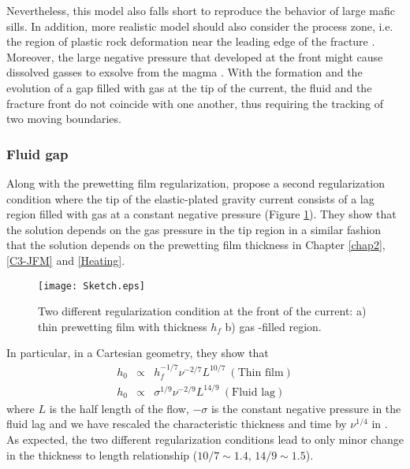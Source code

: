 Nevertheless, this model also falls short to reproduce the behavior of
large  mafic sills.   In addition,  more realistic  model should  also
consider the process zone, i.e. the region of plastic rock deformation
near the leading edge of the fracture \citep{Bunger:2008cl}. Moreover,
the large  negative pressure that  developed at the front  might cause
dissolved gasses to exsolve from the magma \citep{Lister:2013ia}. With
the formation and the evolution of a gap filled with gas at the tip of
the current, the fluid and the fracture front do not coincide with one
another, thus requiring the tracking of two moving boundaries.

\subsubsection*{Fluid gap}
\label{sec:fracturation}

Along      with      the     prewetting      film      regularization,
\citet{Anonymous:QWXp_4JV} propose  a second  regularization condition
where the tip of the elastic-plated  gravity current consists of a lag
region  filled  with  gas  at a  constant  negative  pressure  (Figure
\ref{C7-Sketch}).   They show  that the  solution depends  on the  gas
pressure in  the tip  region in  a similar  fashion that  the solution
depends  on  the prewetting  film  thickness  in Chapter  \ref{chap2},
\ref{C3-JFM} and \ref{Heating}.
\begin{figure}[h!]
 \begin{center}
 \graphicspath{ {/Users/thorey/Documents/These/Manuscript/Figure/Chapter7/} }
 \texttt{[image: Sketch.eps]}
 \caption{Two different regularization condition at the front of
 the current: a) thin prewetting film with thickness $h_f$ b) gas
 -filled region.}
 \label{C7-Sketch}
 \end{center}
\end{figure}
In particular, in a Cartesian geometry, they show that
\begin{eqnarray}
 h_0&\propto& h_f^{-1/7}\nu^{-2/7}L^{10/7}~(\text{Thin film})\\
 h_0&\propto& \sigma^{1/9}\nu^{-2/9}L^{14/9}~(\text{Fluid lag})
\end{eqnarray}
where $L$  is the half length  of the flow, $-\sigma$  is the constant
negative  pressure  in  the  fluid   lag  and  we  have  rescaled  the
characteristic    thickness    and     time    by    $\nu^{1/4}$    in
\citet{Anonymous:QWXp_4JV}.   As    expected,   the    two   different
regularization conditions lead  to only minor change  in the thickness
to length relationship ($10/7\sim 1.4$, $14/9\sim 1.5 $).

